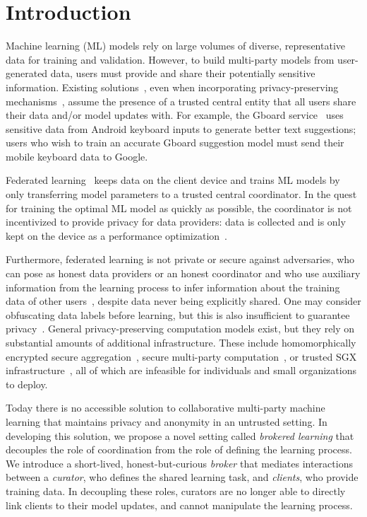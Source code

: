 \chapter{Introduction}
\label{sec:intro}

Machine learning (ML) models rely on large volumes of diverse,
representative data for training and validation. However, to build
multi-party models from user-generated data, users must provide and
share their potentially sensitive information. Existing 
solutions~\cite{Low:2012, Li:2014}, even when incorporating
privacy-preserving mechanisms~\cite{Abadi:2016}, assume
the presence of a trusted central entity that all users share
their data and/or model updates with. For example, the Gboard
service~\cite{Gboard:2017} uses sensitive data from Android keyboard
inputs to generate better text suggestions; users who wish to train
an accurate Gboard suggestion model must send their mobile keyboard
data to Google.

Federated learning~\cite{McMahan:2017} keeps data on the client device
and trains ML models by only transferring model parameters to a trusted
central coordinator. In the quest for training the optimal ML model as
quickly as possible, the coordinator is not incentivized to provide
privacy for data providers: data is collected and is only kept on the
device as a performance optimization~\cite{McMahan:2017}.  

Furthermore, federated learning is not private or secure against
adversaries, who can pose as honest data providers or an honest
coordinator and who use auxiliary information from the learning process to
infer information about the training data of other 
users~\cite{Hitaj:2017}, despite data never being
explicitly shared. One may consider obfuscating data labels before
learning, but this is also insufficient to guarantee 
privacy~\cite{Calandrino:2011}. General privacy-preserving computation
models exist, but they rely on substantial amounts of additional
infrastructure. These include homomorphically encrypted secure
aggregation~\cite{Bonawitz:2017}, secure multi-party 
computation~\cite{Mohassel:2017}, or trusted SGX
infrastructure~\cite{Ohrimenko:2016}, all of which are infeasible for
individuals and small organizations to deploy.

Today there is no accessible solution to collaborative multi-party
machine learning that maintains privacy and anonymity in an untrusted
setting. In developing this solution, we propose a novel setting
called \textit{brokered learning} that decouples the role of
coordination from the role of defining the learning process. We
introduce a short-lived, honest-but-curious \emph{broker} that mediates
interactions between a \emph{curator}, who defines the shared learning
task, and \emph{clients}, who provide training data. In decoupling
these roles, curators are no longer able to directly link clients to
their model updates, and cannot manipulate the learning
process.


